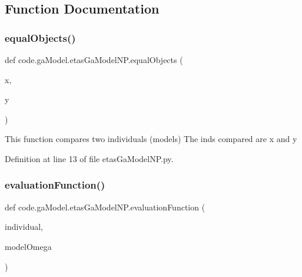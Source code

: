 \subsection{Function Documentation}
\mbox{\label{namespacecode_1_1ga_model_1_1etas_ga_model_n_p_a55347c3a6b9ba79bbafaea3eb0e01d02}} 
\subsubsection{\texorpdfstring{equal\+Objects()}{equalObjects()}}
{\footnotesize\ttfamily def code.\+ga\+Model.\+etas\+Ga\+Model\+N\+P.\+equal\+Objects (\begin{DoxyParamCaption}\item[{}]{x,  }\item[{}]{y }\end{DoxyParamCaption})}

\begin{DoxyVerb}This function compares two individuals (models)
The inds compared are x and y
\end{DoxyVerb}
 

Definition at line 13 of file etas\+Ga\+Model\+N\+P.\+py.

\mbox{\label{namespacecode_1_1ga_model_1_1etas_ga_model_n_p_ac4293bc9b34c59edb160dd415aab67d4}} 
\subsubsection{\texorpdfstring{evaluation\+Function()}{evaluationFunction()}}
{\footnotesize\ttfamily def code.\+ga\+Model.\+etas\+Ga\+Model\+N\+P.\+evaluation\+Function (\begin{DoxyParamCaption}\item[{}]{individual,  }\item[{}]{model\+Omega }\end{DoxyParamCaption})}

